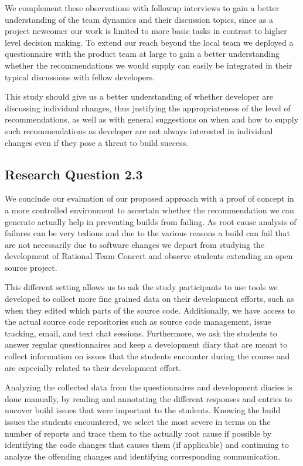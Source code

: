 We complement these observations with followup interviews to gain a better understanding of the team dynamics and their discussion topics, since as a project newcomer our work is limited to more basic tasks in contrast to higher level decision making.
To extend our reach beyond the local team we deployed a questionnaire with the product team at large to gain a better understanding whether the recommendations we would supply can easily be integrated in their typical discussions with fellow developers.

This study should give us a better understanding of whether developer are discussing individual changes, thus justifying the appropriateness of the level of recommendations, as well as with general suggestions on when and how to supply such recommendations as developer are not always interested in individual changes even if they pose a threat to build success.

\subsection{Research Question 2.3}
We conclude our evaluation of our proposed approach with  a proof of concept in a more controlled environment to ascertain whether the recommendation we can generate actually help in preventing builds from failing.
As root cause analysis of failures can be very tedious and due to the various reasons a build can fail that are not necessarily due to software changes we depart from studying the development of Rational Team Concert and observe students extending an open source project.

This different setting allows us to ask the study participants to use tools we developed to collect more fine grained data on their development efforts, such as when they edited which parts of the source code.
Additionally, we have access to the actual source code repositories such as source code management, issue tracking, email, and text chat sessions.
Furthermore, we ask the students to answer regular questionnaires and keep a development diary that are meant to collect information on issues that the students encounter during the course and are especially related to their development effort.

Analyzing the collected data from the questionnaires and development diaries is done manually, by reading and annotating the different responses and entries to uncover build issues that were important to the students.
Knowing the build issues the students encountered, we select the most severe in terms on the number of reports and trace them to the actually root cause if possible by identifying the code changes that causes them (if applicable) and continuing to analyze the offending changes and identifying corresponding communication.

